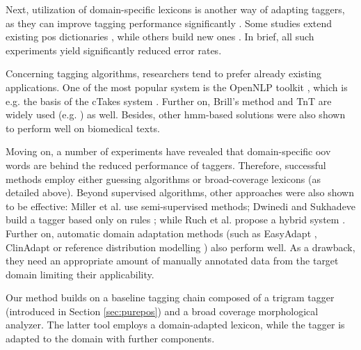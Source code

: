 Next, utilization of domain-specific lexicons is another way of adapting taggers, as they can improve tagging performance significantly \cite{coden2005domain,ruch2000minimal}. 
Some studies extend existing \acrshort{pos} dictionaries \cite{divita2006dtagger}, while others build new ones \cite{Smith2006}. 
In brief, all such experiments yield significantly reduced error rates. 

Concerning tagging algorithms, researchers tend to prefer already existing applications. 
One of the most popular system is the OpenNLP toolkit \cite{Baldridge2002}, which is e.g. the basis of the cTakes system \cite{Savova2010}.
Further on, Brill’s method \cite{Brill1992} and TnT \cite{Brants2000} are widely used (e.g. \cite{hahn2004tagging,Savova2010,pestian2004development}) as well. 
Besides, other \acrshort{hmm}-based solutions were also shown to perform well \cite{barrett2011token,coden2005domain,divita2006dtagger,hahn2004tagging,pakhomov2006developing,rost2008lessons,ruch2000minimal} on biomedical texts. 

Moving on, a number of experiments have revealed \cite{ferraro2013improving,ruch2000minimal,Smith2006} that domain-specific \acrshort{oov} words are behind the reduced performance of taggers. 
Therefore, successful methods employ either guessing algorithms \cite{barrett2011token,divita2006dtagger,rost2008lessons,ruch2000minimal,Smith2006} or broad-coverage lexicons (as detailed above). 
Beyond supervised algorithms, other approaches were also shown to be effective: Miller et al. \cite{miller2007building} use semi-supervised methods;
Dwinedi and Sukhadeve build a tagger based only on rules \cite{dwivedi8rule}; while Ruch et al. propose a hybrid system \cite{ruch2000minimal}. 
Further on, automatic domain adaptation methods (such as EasyAdapt \cite{daume2007frustratingly}, ClinAdapt \cite{ferraro2013improving} 
or reference distribution modelling  \cite{tateisi2006subdomain}) also perform well. As a drawback, they need an appropriate amount of manually annotated data from the target domain limiting their applicability. 

Our method builds on a baseline tagging chain composed of a trigram tagger (introduced in Section \ref{sec:purepos}) and a broad coverage morphological analyzer. 
The latter tool employs a domain-adapted lexicon, while the tagger is adapted to the domain with further components.

